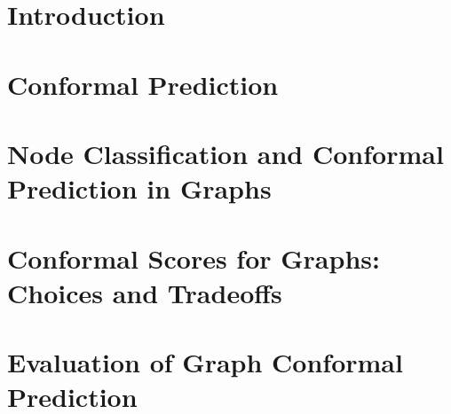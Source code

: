 \section{Introduction}


\section{Conformal Prediction}



\section{Node Classification and Conformal Prediction in Graphs}


\section{Conformal Scores for Graphs: Choices and Tradeoffs}
\label{chp:graphConformal:sec:conformal_scores_tradeoffs}


\section{Evaluation of Graph Conformal Prediction}




\begin{subappendices}
    
\end{subappendices}
